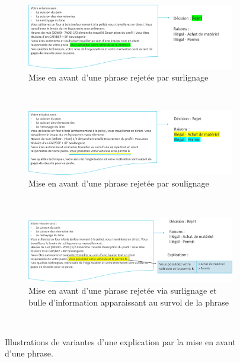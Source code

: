 \begin{figure}[htpb!]
    \centering
    \begin{subfigure}[b]{\textwidth}
        \centering \includegraphics[width=\textwidth]{S2-Explicabilite_locale/figures/prototype_phrase1.png}
        \caption{Mise en avant d'une phrase rejetée par surlignage}
        \label{fig:prototype_phrase1}
    \end{subfigure}
    ~
    \begin{subfigure}[b]{\textwidth}
        \centering \includegraphics[width=\textwidth]{S2-Explicabilite_locale/figures/prototype_phrase2.png}
        \caption{Mise en avant d'une phrase rejetée par soulignage}
        \label{fig:prototype_phrase2}
    \end{subfigure}
    ~
    \begin{subfigure}[b]{\textwidth}
        \centering \includegraphics[width=\textwidth]{S2-Explicabilite_locale/figures/prototype_phrase3.png}
        \caption{Mise en avant d'une phrase rejetée via surlignage et bulle d'information apparaissant au survol de la phrase}
        \label{fig:prototype_phrase3}
    \end{subfigure}
    ~
    \caption{Illustrations de variantes d'une explication par la mise en avant d'une phrase.
    }\label{fig:prototype_phrase}
\end{figure}

